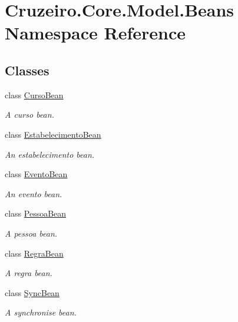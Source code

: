 \hypertarget{namespace_cruzeiro_1_1_core_1_1_model_1_1_beans}{}\section{Cruzeiro.\+Core.\+Model.\+Beans Namespace Reference}
\label{namespace_cruzeiro_1_1_core_1_1_model_1_1_beans}
\subsection*{Classes}
\begin{DoxyCompactItemize}
\item 
class \hyperlink{class_cruzeiro_1_1_core_1_1_model_1_1_beans_1_1_curso_bean}{Curso\+Bean}
\begin{DoxyCompactList}\small\item\em A curso bean. \end{DoxyCompactList}\item 
class \hyperlink{class_cruzeiro_1_1_core_1_1_model_1_1_beans_1_1_estabelecimento_bean}{Estabelecimento\+Bean}
\begin{DoxyCompactList}\small\item\em An estabelecimento bean. \end{DoxyCompactList}\item 
class \hyperlink{class_cruzeiro_1_1_core_1_1_model_1_1_beans_1_1_evento_bean}{Evento\+Bean}
\begin{DoxyCompactList}\small\item\em An evento bean. \end{DoxyCompactList}\item 
class \hyperlink{class_cruzeiro_1_1_core_1_1_model_1_1_beans_1_1_pessoa_bean}{Pessoa\+Bean}
\begin{DoxyCompactList}\small\item\em A pessoa bean. \end{DoxyCompactList}\item 
class \hyperlink{class_cruzeiro_1_1_core_1_1_model_1_1_beans_1_1_regra_bean}{Regra\+Bean}
\begin{DoxyCompactList}\small\item\em A regra bean. \end{DoxyCompactList}\item 
class \hyperlink{class_cruzeiro_1_1_core_1_1_model_1_1_beans_1_1_sync_bean}{Sync\+Bean}
\begin{DoxyCompactList}\small\item\em A synchronise bean. \end{DoxyCompactList}\item 

\end{DoxyCompactItemize}
